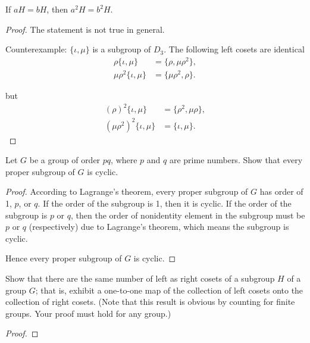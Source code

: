 \begin{exercise}
    If $aH = bH$, then $a^{2}H = b^{2}H$.
\end{exercise}

\begin{proof}
    The statement is not true in general.

    Counterexample: $\{ \iota, \mu \}$ is a subgroup of $D_{3}$. The following left cosets are identical
    \begin{align*}
        \rho\{ \iota, \mu \}        & = \{ \rho, \mu\rho^{2} \}, \\
        \mu\rho^{2}\{ \iota, \mu \} & = \{ \mu\rho^{2}, \rho \}.
    \end{align*}

    but
    \begin{align*}
        {(\rho)}^{2}\{ \iota, \mu \}        & = \{ \rho^{2}, \mu\rho \}, \\
        {(\mu\rho^{2})}^{2}\{ \iota, \mu \} & = \{ \iota, \mu \}.
    \end{align*}
\end{proof}

\begin{exercise}
    Let $G$ be a group of order $pq$, where $p$ and $q$ are prime numbers. Show that every proper subgroup of $G$ is cyclic.
\end{exercise}

\begin{proof}
    According to Lagrange's theorem, every proper subgroup of $G$ has order of 1, $p$, or $q$. If the order of the subgroup is 1, then it is cyclic. If the order of the subgroup is $p$ or $q$, then the order of nonidentity element in the subgroup must be $p$ or $q$ (respectively) due to Lagrange's theorem, which means the subgroup is cyclic.

    Hence every proper subgroup of $G$ is cyclic.
\end{proof}

\begin{exercise}
    Show that there are the same number of left as right cosets of a subgroup $H$ of a group $G$; that is, exhibit a one-to-one map of the collection of left cosets onto the collection of right cosets. (Note that this result is obvious by counting for finite groups. Your proof must hold for any group.)
\end{exercise}

\begin{proof}
\end{proof}

